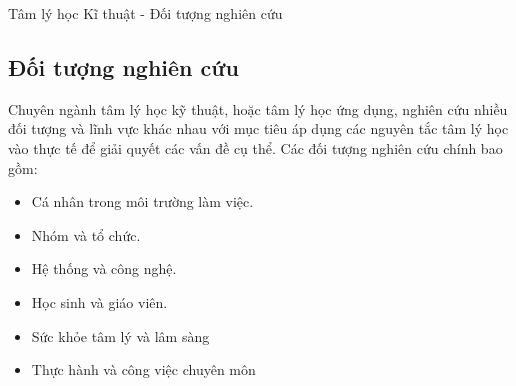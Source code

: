 \documentclass[../main.tex]{subfiles}
\begin{document}
\begin{frame}{Tâm lý học Kĩ thuật - Đối tượng nghiên cứu}
\subsection{Đối tượng nghiên cứu}
Chuyên ngành tâm lý học kỹ thuật, hoặc tâm lý học ứng dụng, nghiên cứu nhiều đối tượng và lĩnh vực khác nhau với mục tiêu áp dụng các nguyên tắc tâm lý học vào thực tế để giải quyết các vấn đề cụ thể. 
Các đối tượng nghiên cứu chính bao gồm:
\begin{itemize}
    \item Cá nhân trong môi trường làm việc.
    \item Nhóm và tổ chức.
    \item Hệ thống và công nghệ.
    \item Học sinh và giáo viên.
    \item Sức khỏe tâm lý và lâm sàng
    \item Thực hành và công việc chuyên môn

\end{itemize}

\end{frame}
\end{document}
